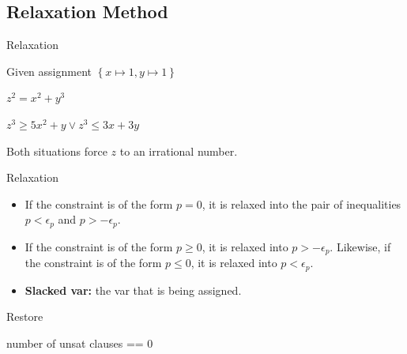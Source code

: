 \subsection{Relaxation Method}
\begin{frame}{Relaxation}
    \begin{Example}
        Given assignment $\left\{x\mapsto 1, y\mapsto 1\right\}$
        \begin{minipage}{0.45\textwidth}
            \centering
            $z^2 = x^2 + y^3$
        \end{minipage}
        \begin{minipage}{0.45\textwidth}
            \centering
            $z^3 \ge 5 x^2 + y \vee z^3 \le 3x + 3y$
        \end{minipage}
        \end{Example}
        \vspace{0.6cm}
        Both situations force $z$ to an irrational number.

    \begin{alertblock}{Relaxation}
    \begin{itemize}
        \item If the constraint is of the form $p=0$, it is relaxed into the pair of inequalities $p<\epsilon_p$ and $p>-\epsilon_p$.

        \item If the constraint is of the form $p\ge 0$, it is relaxed into $p>-\epsilon_p$. Likewise, if the constraint is of the form $p\le 0$, it is relaxed into $p<\epsilon_p$.
        \item \textbf{Slacked var:} the var that is being assigned.
    \end{itemize}
    \end{alertblock}
\end{frame}

\begin{frame}{Restore}
    \begin{algorithm}[H]
        \SetAlgoLined
    \Return number of unsat clauses == 0
    \end{algorithm}
\end{frame}

